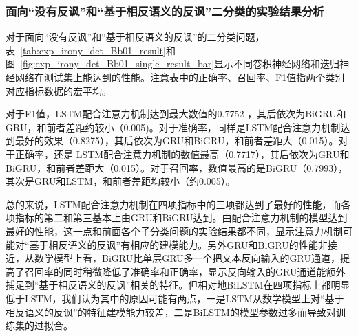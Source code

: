 \subsubsection{面向“没有反讽”和“基于相反语义的反讽”二分类的实验结果分析}

对于面向“没有反讽”和“基于相反语义的反讽”的二分类问题，表~\ref{tab:exp_irony_det_Bb01_result}和图~\ref{fig:exp_irony_det_Bb01_single_result_bar}显示不同卷积神经网络和迭归神经网络在测试集上能达到的性能。注意表中的正确率、召回率、F1值指两个类别对应指标数据的宏平均。

对于F1值，LSTM配合注意力机制达到最大数值的0.7752 ，其后依次为BiGRU和GRU，和前者差距约较小（0.005)。对于准确率，同样是LSTM配合注意力机制达到最好的效果（0.8275），其后依次为GRU和BiGRU，和前者差距大（0.015）。对于正确率，还是 LSTM配合注意力机制的数值最高（0.7717），其后依次为GRU和BiGRU，和前者差距大（0.015）。对于召回率，数值最高的是BiGRU（0.7993），其次是GRU和LSTM，和前者差距均较小（约0.005）。

总的来说，LSTM配合注意力机制在四项指标中的三项都达到了最好的性能，而各项指标的第二和第三基本上由GRU和BiGRU达到。由配合注意力机制的模型达到最好的性能，这一点和前面各个子分类问题的实验结果都不同，显示注意力机制可能对“基于相反语义的反讽”有相应的建模能力。另外GRU和BiGRU的性能非接近，从数学模型上看，BiGRU比单层GRU多一个把文本反向输入的GRU通道，提高了召回率的同时稍微降低了准确率和正确率，显示反向输入的GRU通道能额外捕足到“基于相反语义的反讽”相关的特征。但相对地BiLSTM在四项指标上都明显低于LSTM，我们认为其中的原因可能有两点，一是LSTM从数学模型上对“基于相反语义的反讽”的特征建模能力较差，二是BiLSTM的模型参数过多而导致对训练集的过拟合。


